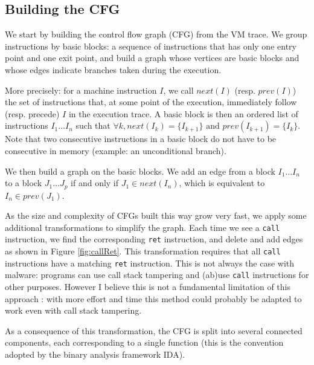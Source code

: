 \documentclass[english]{article}
\begin{document}
\subsection{Building the CFG}

We start by building the control flow graph (CFG) from the VM trace. We group instructions by basic blocks: a sequence of instructions that has only one entry point and one exit point, and build a graph whose vertices are basic blocks and whose edges indicate branches taken during the execution.

More precisely: for a machine instruction $I$, we call $next(I)$ (resp. $prev(I)$) the set of instructions that, at some point of the execution, immediately follow (resp. precede) $I$ in the execution trace. A basic block is then an ordered list of instructions $I_1 \dots I_n$ such that $\forall k, next(I_k) = \{I_{k+1}\} \textrm{ and } prev(I_{k+1}) = \{I_k\}$. Note that two consecutive instructions in a basic block do not have to be consecutive in memory (example: an unconditional branch). 

We then build a graph on the basic blocks. We add an edge from a block $I_1 \dots I_n$ to a block $J_1 \dots J_p$ if and only if $J_1 \in next(I_n)$, which is equivalent to $I_n \in prev(J_1)$.

As the size and complexity of CFGs built this way grow very fast, we apply some additional transformations to simplify the graph. Each time we see a \texttt{call} instruction, we find the corresponding \texttt{ret} instruction, and delete and add edges as shown in Figure \ref{fig:callRet}. This transformation requires that all \texttt{call} instructions have a matching \texttt{ret} instruction. This is not always the case with malware: programs can use call stack tampering and (ab)use \texttt{call} instructions for other purposes. However I believe this is not a fundamental limitation of this approach : with more effort and time this method could probably be adapted to work even with call stack tampering.

As a consequence of this transformation, the CFG is split into several connected components, each corresponding to a single function (this is the convention adopted by the binary analysis framework IDA).
\end{document}
